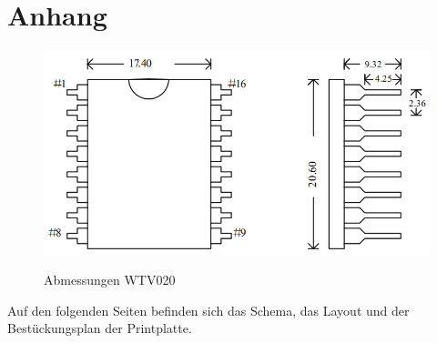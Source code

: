 \chapter{Anhang}
\thispagestyle{fancy}  
\begin{figure}[h]
\centering
\includegraphics[scale=0.5]{Bilder/footprint_wtv020.png}
\label{fig:irgendesBild}
\caption[Abmessungen WTV020]{Abmessungen WTV020}
\end{figure}

Auf den folgenden Seiten befinden sich das Schema, das Layout und der Bestückungsplan der Printplatte.


\label{pdf:SchemaSpannungsversorgung}


\label{pdf:SchemaUSB}


\label{pdf:SchemaMikrocontroller}